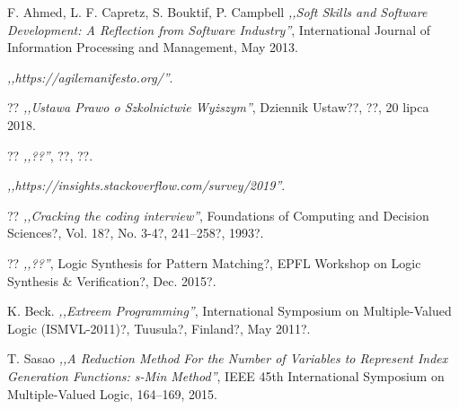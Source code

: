 
\begin{thebibliography}{99}


 F. Ahmed, L. F. Capretz, S. Bouktif, P. Campbell \emph{,,Soft Skills and Software Development: A Reflection from Software Industry''}, International Journal of Information Processing and Management, May 2013.

 \emph{,,https://agilemanifesto.org/''}.

 ?? \emph{,,Ustawa Prawo o Szkolnictwie Wyższym''}, Dziennik Ustaw??, ??, 20 lipca 2018.

 ??  \emph{,,??''}, ??, ??.

 \emph{,,https://insights.stackoverflow.com/survey/2019''}.

 ?? \emph{,,Cracking the coding interview''}, Foundations of Computing and Decision Sciences?, Vol. 18?, No. 3-4?, 241–258?, 1993?.

 ?? \emph{,,??''}, Logic Synthesis for Pattern Matching?, EPFL Workshop on Logic Synthesis \& Verification?, Dec. 2015?.

 K. Beck. \emph{,,Extreem Programming''}, International Symposium on Multiple-Valued Logic (ISMVL-2011)?, Tuusula?, Finland?, May 2011?.

 T. Sasao \emph{,,A Reduction Method For the Number of Variables to Represent Index Generation Functions: s-Min Method''}, IEEE 45th International Symposium on Multiple-Valued Logic, 164–169, 2015.


\end{thebibliography}
